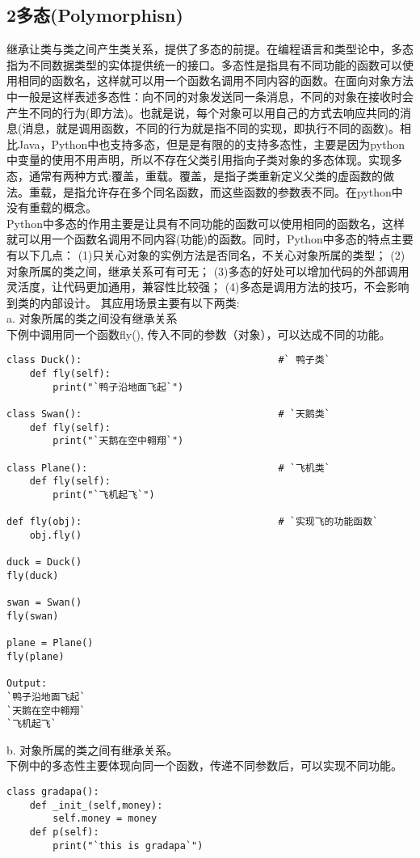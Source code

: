 \documentclass[UTF8]{ctexart}
\begin{document}
\begin{flushleft}
\subsection*{2\;多态(Polymorphisn)}
\qquad 继承让类与类之间产生类关系，提供了多态的前提。在编程语言和类型论中，多态指为不同数据类型的实体提供统一的接口。多态性是指具有不同功能的函数可以使用相同的函数名，这样就可以用一个函数名调用不同内容的函数。在面向对象方法中一般是这样表述多态性：向不同的对象发送同一条消息，不同的对象在接收时会产生不同的行为(即方法)。也就是说，每个对象可以用自己的方式去响应共同的消息(消息，就是调用函数，不同的行为就是指不同的实现，即执行不同的函数)。相比Java，Python中也支持多态，但是是有限的的支持多态性，主要是因为python中变量的使用不用声明，所以不存在父类引用指向子类对象的多态体现。实现多态，通常有两种方式:覆盖，重载。覆盖，是指子类重新定义父类的虚函数的做法。重载，是指允许存在多个同名函数，而这些函数的参数表不同。在python中没有重载的概念。\\
\qquad Python中多态的作用主要是让具有不同功能的函数可以使用相同的函数名，这样就可以用一个函数名调用不同内容(功能)的函数。同时，Python中多态的特点主要有以下几点：
(1)只关心对象的实例方法是否同名，不关心对象所属的类型；
(2)对象所属的类之间，继承关系可有可无；
(3)多态的好处可以增加代码的外部调用灵活度，让代码更加通用，兼容性比较强；
(4)多态是调用方法的技巧，不会影响到类的内部设计。
其应用场景主要有以下两类:\\
a. 对象所属的类之间没有继承关系\\
下例中调用同一个函数fly(), 传入不同的参数（对象），可以达成不同的功能。
\begin{lstlisting}
class Duck():                                  #` 鸭子类`
    def fly(self):
        print("`鸭子沿地面飞起`")

class Swan():                                  # `天鹅类`
    def fly(self):
        print("`天鹅在空中翱翔`")

class Plane():                                 # `飞机类`
    def fly(self):
        print("`飞机起飞`")

def fly(obj):                                  # `实现飞的功能函数`
    obj.fly()

duck = Duck()
fly(duck)

swan = Swan()
fly(swan)

plane = Plane()
fly(plane)
 
Output:
`鸭子沿地面飞起`
`天鹅在空中翱翔`
`飞机起飞`
\end{lstlisting}
b. 对象所属的类之间有继承关系。\\
下例中的多态性主要体现向同一个函数，传递不同参数后，可以实现不同功能。
\begin{lstlisting}
class gradapa():
    def _init_(self,money):
        self.money = money
    def p(self):
        print("`this is gradapa`")


\end{lstlisting}
\end{flushleft}
\end{document}
